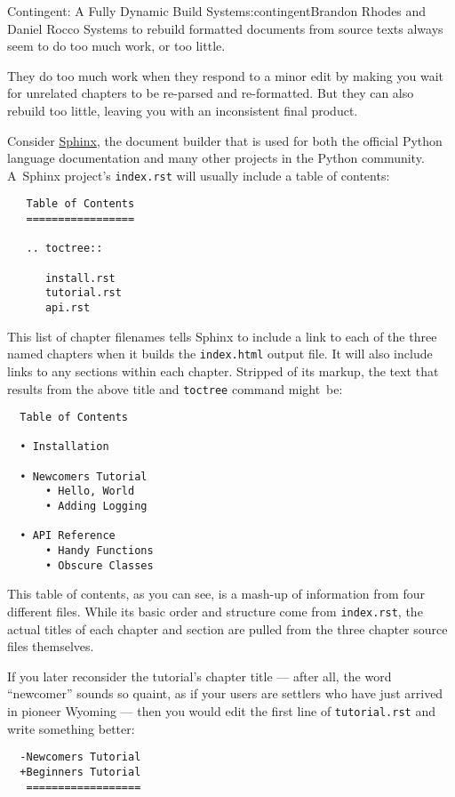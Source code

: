 \begin{aosachapter}{Contingent: A Fully Dynamic Build System}{s:contingent}{Brandon Rhodes and Daniel Rocco}
Systems to rebuild formatted documents from source texts always seem to
do too much work, or too little.

They do too much work when they respond to a minor edit by making you
wait for unrelated chapters to be re-parsed and re-formatted. But they
can also rebuild too little, leaving you with an inconsistent final
product.

Consider \href{http://sphinx-doc.org/}{Sphinx}, the document builder
that is used for both the official Python language documentation and
many other projects in the Python community. A~Sphinx project's
\texttt{index.rst} will usually include a table of contents:

\begin{verbatim}
   Table of Contents
   =================

   .. toctree::

      install.rst
      tutorial.rst
      api.rst
\end{verbatim}

This list of chapter filenames tells Sphinx to include a link to each of
the three named chapters when it builds the \texttt{index.html} output
file. It will also include links to any sections within each chapter.
Stripped of its markup, the text that results from the above title and
\texttt{toctree} command might~be:

\begin{verbatim}
  Table of Contents

  • Installation

  • Newcomers Tutorial
      • Hello, World
      • Adding Logging

  • API Reference
      • Handy Functions
      • Obscure Classes
\end{verbatim}

This table of contents, as you can see, is a mash-up of information from
four different files. While its basic order and structure come from
\texttt{index.rst}, the actual titles of each chapter and section are
pulled from the three chapter source files themselves.

If you later reconsider the tutorial's chapter title --- after all, the
word ``newcomer'' sounds so quaint, as if your users are settlers who
have just arrived in pioneer Wyoming --- then you would edit the first
line of \texttt{tutorial.rst} and write something better:

\begin{verbatim}
  -Newcomers Tutorial
  +Beginners Tutorial
   ==================


\end{verbatim}
\end{aosachapter}
